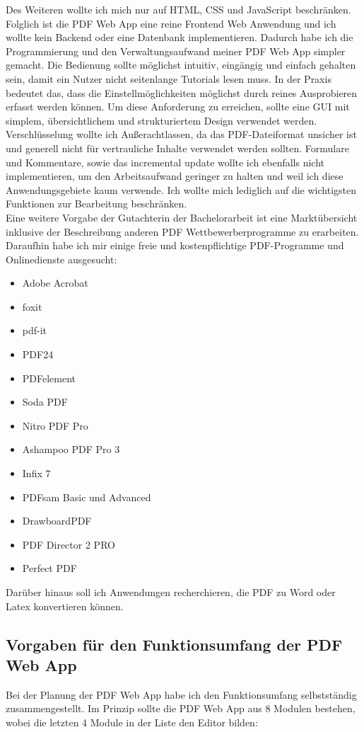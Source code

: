 Des Weiteren wollte ich mich nur auf HTML, CSS und JavaScript beschränken. Folglich ist die PDF Web App eine reine Frontend Web Anwendung und ich wollte kein Backend oder eine Datenbank implementieren. Dadurch habe ich die Programmierung und den Verwaltungsaufwand meiner PDF Web App simpler gemacht. Die Bedienung sollte möglichst intuitiv, eingängig und einfach gehalten sein, damit ein Nutzer nicht seitenlange Tutorials lesen muss. In der Praxis bedeutet das, dass die Einstellmöglichkeiten möglichst durch reines Ausprobieren erfasst werden können. Um diese Anforderung zu erreichen, sollte eine GUI mit simplem, übersichtlichem und strukturiertem Design verwendet werden. Verschlüsselung wollte ich Außerachtlassen, da das PDF-Dateiformat unsicher ist und generell nicht für vertrauliche Inhalte verwendet werden sollten. Formulare und Kommentare, sowie das incremental update wollte ich ebenfalls nicht implementieren, um den Arbeitsaufwand geringer zu halten und weil ich diese Anwendungsgebiete kaum verwende. Ich wollte mich lediglich auf die wichtigsten Funktionen zur Bearbeitung beschränken. \\
Eine weitere Vorgabe der Gutachterin der Bachelorarbeit ist eine Marktübersicht inklusive der Beschreibung anderen PDF Wettbewerberprogramme zu erarbeiten. Daraufhin habe ich mir einige freie und kostenpflichtige PDF-Programme und Onlinedienste ausgesucht: 

\begin{itemize}
	\item Adobe Acrobat
	\item foxit
	\item pdf-it
	\item PDF24
	\item PDFelement
	\item Soda PDF
	\item Nitro PDF Pro 
	\item Ashampoo PDF Pro 3
	\item Infix 7
	\item PDFsam Basic und Advanced
	\item DrawboardPDF
	\item PDF Director 2 PRO
	\item Perfect PDF
\end{itemize}

Darüber hinaus soll ich Anwendungen recherchieren, die PDF zu Word oder Latex konvertieren können. 


\subsection{Vorgaben für den Funktionsumfang der PDF Web App}
Bei der Planung der PDF Web App habe ich den Funktionsumfang selbstständig zusammengestellt. Im Prinzip sollte die PDF Web App aus 8 Modulen bestehen, wobei die letzten 4 Module in der Liste den Editor bilden:

